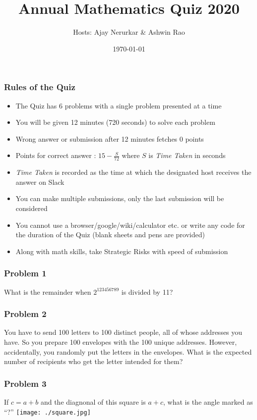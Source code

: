 \documentclass[handout]{beamer}
\title[Mathematics Quiz]{Annual Mathematics Quiz 2020} %
\author{Hosts: Ajay Nerurkar \& Ashwin Rao} %
\institute[Target India] %
{
Target India
}
\date{\today} %
\begin{document}
\begin{frame}
\titlepage %
\end{frame}

\begin{frame}
\frametitle{Rules of the Quiz}
\pause
\begin{itemize}[<+->]
\item The Quiz has 6 problems with a single problem presented at a time
\item You will be given 12 minutes (720 seconds) to solve each problem 
\item Wrong answer or submission after 12 minutes fetches 0 points
\item Points for correct answer : $15 - \frac S {72}$ where $S$ is {\em Time Taken} in seconds
\item {\em Time Taken} is recorded as the time at which the designated host receives the answer on Slack
\item You can make multiple submissions, only the last submission will be considered
\item You cannot use a browser/google/wiki/calculator etc. or write any code for the duration of the Quiz (blank sheets and pens are provided)
\item Along with math skills, take Strategic Risks with speed of submission
\end{itemize}
\end{frame}



\begin{frame}
\frametitle{Problem 1}
What is the remainder when $2^{123456789}$ is divided by 11?
\end{frame}


\begin{frame}
\frametitle{Problem 2}
You have to send 100 letters to 100 distinct people, all of whose addresses you have. So you prepare 100 envelopes with the 100 unique addresses. However, accidentally, you randomly put the letters in the envelopes. What is the expected number of recipients who get the letter intended for them?
\end{frame}

\begin{frame}
\frametitle{Problem 3}
If $c = a+b$ and the diagnonal of this square is $a+c$, what is the angle marked as ``?''
\texttt{[image: ./square.jpg]}
\end{frame}

\end{document}
